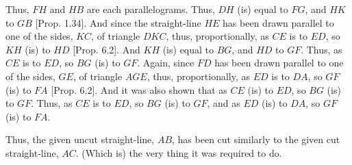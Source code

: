 \begin{Parallel}{}{}
{Thus, $FH$ and $HB$ are each parallelograms. Thus, $DH$ (is) equal to $FG$,
and $HK$ to $GB$ [Prop. 1.34]. 
And since the straight-line $HE$ has been drawn parallel to one of the
sides, $KC$, of triangle $DKC$, thus, proportionally, as $CE$ is to $ED$,  so $KH$
(is) to $HD$ [Prop. 6.2]. And $KH$ (is)
equal to $BG$, and $HD$ to $GF$. Thus, as $CE$ is to $ED$, so $BG$ (is) to $GF$. 
Again, since $FD$ has been drawn parallel to one of the sides, $GE$, of
triangle $AGE$, thus, proportionally, as $ED$ is to $DA$, so $GF$ (is) to $FA$
[Prop. 6.2]. And it was also shown
that as $CE$ (is) to $ED$, so $BG$ (is) to $GF$. Thus, as
$CE$ is to $ED$, so $BG$ (is) to $GF$, and as $ED$ (is) to $DA$, so $GF$ (is) to
$FA$.

Thus, the given uncut straight-line, $AB$, has been cut similarly
to the given cut straight-line, $AC$. (Which is) the very thing it was required to do.}
\end{Parallel}

